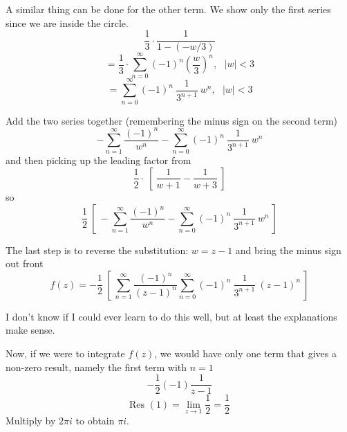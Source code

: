\documentclass[11pt, oneside]{article}   	%
\begin{document}
A similar thing can be done for the other term.  We show only the first series since we are inside the circle.
\[  \frac{1}{3} \cdot \frac{1}{1 - (-w/3)} \]
\[ = \frac{1}{3} \cdot  \sum_{n=0}^{\infty} (-1)^n (\frac{w}{3})^n , \ \ \ |w| < 3 \]
\[ = \sum_{n=0}^{\infty} (-1)^n \ \frac{1}{3^{n+1}} \ w^n , \ \ \ |w| < 3 \]

Add the two series together (remembering the minus sign on the second term)
\[ -\sum_{n=1}^{\infty} \frac{(-1)^n}{w^n} - \sum_{n=0}^{\infty} (-1)^n \ \frac{1}{3^{n+1}} \ w^n \]
and then picking up the leading factor from 
\[ \frac{1}{2} \cdot \ [ \ \frac{1}{w+1} - \frac{1}{w+3} \ ] \]
so
\[ \frac{1}{2} \ [ \ -\sum_{n=1}^{\infty} \frac{(-1)^n}{w^n} - \sum_{n=0}^{\infty} (-1)^n \ \frac{1}{3^{n+1}} \ w^n \ ] \]

The last step is to reverse the substitution:  $w = z - 1$ and bring the minus sign out front
\[ f(z) = - \frac{1}{2} \ [ \ \sum_{n=1}^{\infty} \frac{(-1)^n}{(z-1)^n} \sum_{n=0}^{\infty} (-1)^n \ \frac{1}{3^{n+1}} \ (z-1)^n \ ] \]

I don't know if I could ever learn to do this well, but at least the explanations make sense.

Now, if we were to integrate $f(z)$, we would have only one term that gives a non-zero result, namely the first term with $n=1$
\[ - \frac{1}{2} (-1) \frac{1}{z-1} \]
\[ \text{Res }(1) = \lim_{z \rightarrow 1} \frac{1}{2} = \frac{1}{2} \]
Multiply by $2 \pi i$ to obtain $\pi i$.
\end{document}
